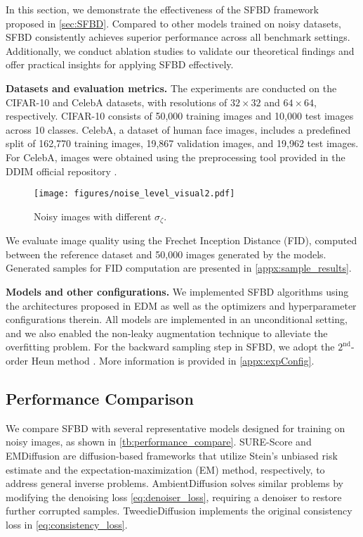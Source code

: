 



In this section, we demonstrate the effectiveness of the SFBD framework proposed in \cref{sec:SFBD}. Compared to other models trained on noisy datasets, SFBD consistently achieves superior performance across all benchmark settings. Additionally, we conduct ablation studies to validate our theoretical findings and offer practical insights for applying SFBD effectively.

\textbf{Datasets and evaluation metrics.} The experiments are conducted on the CIFAR-10 \citep{Krizhevsky2009} and CelebA \citep{LiuGL2022} datasets, with resolutions of  $32 \times 32$  and  $64 \times 64$, respectively. CIFAR-10 consists of 50,000 training images and 10,000 test images across 10 classes. CelebA, a dataset of human face images, includes a predefined split of 162,770 training images, 19,867 validation images, and 19,962 test images. For CelebA,  images were obtained using the preprocessing tool provided in the DDIM official repository  \citep{SongME2021}.

\begin{figure}[t]
	\centering
	\texttt{[image: figures/noise\_level\_visual2.pdf]}
	\caption{Noisy images with different $\sigma_\zeta$.}
	\label{fig:noisy_img_var_sigma}
	\vspace{-1em}
\end{figure}


We evaluate image quality using the Frechet Inception Distance (FID), computed between the reference dataset and 50,000 images generated by the models. Generated samples for FID computation are presented in \cref{appx:sample_results}.


\textbf{Models and other configurations.} We implemented SFBD algorithms using the architectures proposed in EDM \citep{KarrasAAL22} as well as the optimizers and hyperparameter configurations therein. All models are implemented in an unconditional setting, and we also enabled the non-leaky augmentation technique \citep{KarrasAAL22} to alleviate the overfitting problem. For the backward sampling step in SFBD, we adopt the $2^\text{nd}$-order Heun method \citep{KarrasAAL22}. More information is provided in \cref{appx:expConfig}. 


\subsection{Performance Comparison}
We compare SFBD with several representative models designed for training on noisy images, as shown in \cref{tb:performance_compare}. SURE-Score \citep{AaliAKT2023} and EMDiffusion \citep{BaiWCS2024} are diffusion-based frameworks that utilize Stein’s unbiased risk estimate and the expectation-maximization (EM) method, respectively, to address general inverse problems. AmbientDiffusion \citep{DarasSDGDK2023} solves similar problems by modifying the denoising loss \eqref{eq:denoiser_loss}, requiring a denoiser to restore further corrupted samples. TweedieDiffusion \citep{DarasDD2024} implements the original consistency loss in \cref{eq:consistency_loss}.

